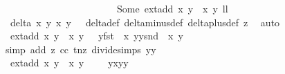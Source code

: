 \begin{isabellebody}
\ \ \ \ \ \ \ \ \ \ \ \ \ \ \ \ \ \ \ \ \ \ \ Some\ {\isacharparenleft}ext{\isacharunderscore}add\ {\isacharparenleft}x{\isacharcomma}\ y{\isacharparenright}\ {\isacharparenleft}{\isasymtau}\ {\isacharparenleft}x{\isacharprime}{\isacharcomma}\ y{\isacharprime}{\isacharparenright}{\isacharparenright}{\isacharcomma}\ l{\isacharplus}l{\isacharprime}{\isacharplus}{}{\isacharparenright}{\isachardoublequoteclose}\isanewline
\ \ \ \ \ \ \ \ \ \ \ \ \ \ \isamarkupfalse%
\ {\isacartoucheopen}delta\ x\ y\ x{\isacharprime}\ y{\isacharprime}\ {\isacharequal}\ {}{\isacartoucheclose}\ delta{\isacharunderscore}def\ delta{\isacharunderscore}minus{\isacharunderscore}def\ delta{\isacharunderscore}plus{\isacharunderscore}def\ z{}\ \isamarkupfalse%
\ auto\isanewline
\ \ \ \ \ \ \ \ \ \ \ \ \isamarkupfalse%
\ {\isachardoublequoteopen}ext{\isacharunderscore}add\ {\isacharparenleft}x{\isacharcomma}\ y{\isacharparenright}\ {\isacharparenleft}{\isasymtau}\ {\isacharparenleft}x{\isacharprime}{\isacharcomma}\ y{\isacharprime}{\isacharparenright}{\isacharparenright}\ {\isacharequal}\ {\isasymrho}\ {\isacharparenleft}y{\isacharasterisk}{\isacharparenleft}fst\ {\isacharparenleft}{\isasymtau}\ {\isacharparenleft}x{\isacharprime}{\isacharcomma}\ y{\isacharprime}{\isacharparenright}{\isacharparenright}{\isacharparenright}{\isacharcomma}y{\isacharasterisk}{\isacharparenleft}snd\ {\isacharparenleft}{\isasymtau}\ {\isacharparenleft}x{\isacharprime}{\isacharcomma}\ y{\isacharprime}{\isacharparenright}{\isacharparenright}{\isacharparenright}{\isacharparenright}{\isachardoublequoteclose}\isanewline
\ \ \ \ \ \ \ \ \ \ \ \ \ \ \isamarkupfalse%
{\isacharparenleft}simp\ add{\isacharcolon}\ z{}\ cc\ t{\isacharunderscore}nz\ divide{\isacharunderscore}simps\ {\isacartoucheopen}y{\isacharasterisk}y\ {\isacharequal}\ {}{\isacartoucheclose}{\isacharparenright}\isanewline
\ \ \ \ \ \ \ \ \ \ \ \ \isamarkupfalse%
\ \isamarkupfalse%
\ {\isachardoublequoteopen}ext{\isacharunderscore}add\ {\isacharparenleft}x{\isacharcomma}\ y{\isacharparenright}\ {\isacharparenleft}{\isasymtau}\ {\isacharparenleft}x{\isacharprime}{\isacharcomma}\ y{\isacharprime}{\isacharparenright}{\isacharparenright}\ {\isacharequal}\ {\isacharparenleft}{\isasymrho}\ {\isasymcirc}\ {\isasymtau}{\isacharparenright}\ {\isacharparenleft}y{\isacharasterisk}x{\isacharprime}{\isacharcomma}y{\isacharasterisk}y{\isacharprime}{\isacharparenright}{\isachardoublequoteclose}\isanewline
\ \ \ \ \ \ \ \ \ \ \ \ \ \ \isamarkupfalse%

\end{isabellebody}
